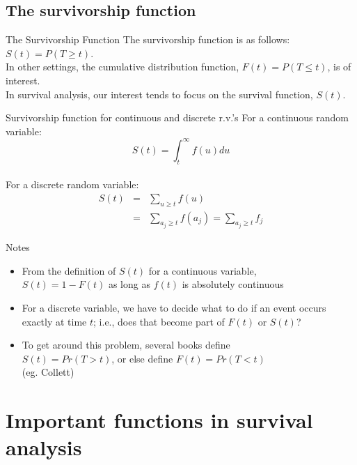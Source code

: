 \documentclass[envcountsect, 10pt, portrait, palatino]{beamer}
\begin{document}
\subsection{The survivorship function}
\begin{frame}{The Survivorship Function}
The survivorship function is as follows:
$ S(t) = P(T \ge t)$. \\[2ex]
In other settings, the cumulative distribution function, $F(t)=P(T\le t)$, is of interest.  \\[2ex]
In survival analysis, our interest tends to focus on the survival function, $S(t)$.
\end{frame}
\begin{frame}{Survivorship function for continuous and discrete r.v.'s}
For a continuous random variable:\\[2ex]
\[   S(t) = \int_{t}^{\infty} f(u) du \]
\\[2ex]
For a discrete random variable:
\begin{eqnarray*}
S(t) & = & \sum_{u \ge t} f(u) \\[1ex]
     & = & \sum_{a_j \ge t} f(a_j) = \sum_{a_j \ge t} f_j
\end{eqnarray*}
\end{frame}
\begin{frame}{Notes}

\begin{itemize}
\item  From the definition of $S(t)$ for a continuous variable,\\
$S(t)=1-F(t)$ as long as $f(t)$ is absolutely continuous
\item  For a discrete variable, we have to decide what to do if an
event occurs exactly at time $t$; i.e., does that become part of $F(t)$ or
$S(t)$?
\item To get around this problem, several books define \\
$S(t)=Pr(T>t)$, or else define $F(t)=Pr(T<t)$ \\(eg. Collett)
\end{itemize}
\end{frame}
\section{Important functions in survival analysis}
\end{document}
